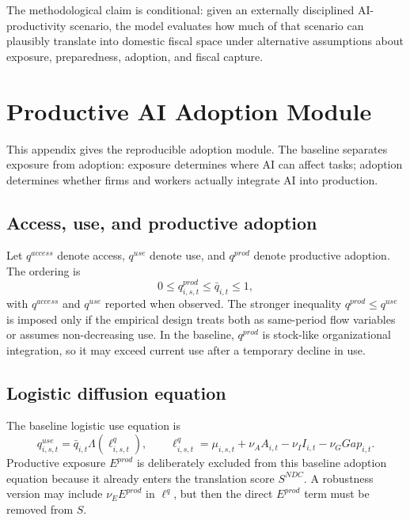\documentclass[11pt,a4paper]{article}
\begin{document}
The methodological claim is conditional: given an externally disciplined AI-productivity scenario, the model evaluates how much of that scenario can plausibly translate into domestic fiscal space under alternative assumptions about exposure, preparedness, adoption, and fiscal capture.




\section{Productive AI Adoption Module}\label{app:adoption_module}

This appendix gives the reproducible adoption module. The baseline separates exposure from adoption: exposure determines where AI can affect tasks; adoption determines whether firms and workers actually integrate AI into production.

\subsection{Access, use, and productive adoption}

Let $q^{access}$ denote access, $q^{use}$ denote use, and $q^{prod}$ denote productive adoption. The ordering is
\begin{equation}
    0\leq q^{prod}_{i,s,t}\leq \bar q_{i,t}\leq1,
\end{equation}
with $q^{access}$ and $q^{use}$ reported when observed. The stronger inequality $q^{prod}\leq q^{use}$ is imposed only if the empirical design treats both as same-period flow variables or assumes non-decreasing use. In the baseline, $q^{prod}$ is stock-like organizational integration, so it may exceed current use after a temporary decline in use.

\subsection{Logistic diffusion equation}

The baseline logistic use equation is
\begin{equation}
    q^{use}_{i,s,t}=\bar q_{i,t}\Lambda(\ell^q_{i,s,t}),
    \qquad
    \ell^q_{i,s,t}=\mu_{i,s,t}+\nu_A A_{i,t}-\nu_I I_{i,t}-\nu_G Gap_{i,t}.
\end{equation}
Productive exposure $E^{prod}$ is deliberately excluded from this baseline adoption equation because it already enters the translation score $S^{NDC}$. A robustness version may include $\nu_EE^{prod}$ in $\ell^q$, but then the direct $E^{prod}$ term must be removed from $S$.
\end{document}
